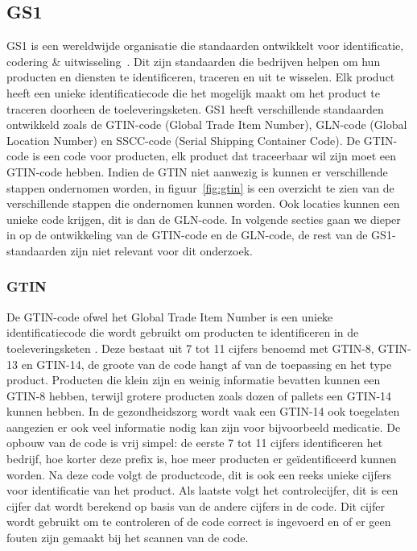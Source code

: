 \subsection{GS1}
GS1 is een wereldwijde organisatie die standaarden ontwikkelt voor identificatie, codering \& uitwisseling~\autocite{GS1standards}.
Dit zijn standaarden die bedrijven helpen om hun producten en diensten te identificeren, traceren en uit te wisselen.
Elk product heeft een unieke identificatiecode die het mogelijk maakt om het product te traceren doorheen de toeleveringsketen.
GS1 heeft verschillende standaarden ontwikkeld zoals de GTIN-code (Global Trade Item Number), GLN-code (Global Location Number) en SSCC-code (Serial Shipping Container Code).
De GTIN-code is een code voor producten, elk product dat traceerbaar wil zijn moet een GTIN-code hebben. 
Indien de GTIN niet aanwezig is kunnen er verschillende stappen ondernomen worden, in figuur~\ref{fig:gtin} is een overzicht te zien van de verschillende stappen die ondernomen kunnen worden.
Ook locaties kunnen een unieke code krijgen, dit is dan de GLN-code. In volgende secties gaan we dieper in op de ontwikkeling van de GTIN-code en de GLN-code, de rest van de GS1-standaarden zijn niet relevant voor dit onderzoek.

\subsubsection{GTIN}
De GTIN-code ofwel het Global Trade Item Number is een unieke identificatiecode die wordt gebruikt om producten te identificeren in de toeleveringsketen \autocite{GTIN2025}.
Deze bestaat uit 7 tot 11 cijfers benoemd met GTIN-8, GTIN-13 en GTIN-14, de groote van de code hangt af van de toepassing en het type product.
Producten die klein zijn en weinig informatie bevatten kunnen een GTIN-8 hebben, terwijl grotere producten zoals dozen of pallets een GTIN-14 kunnen hebben.
In de gezondheidszorg wordt vaak een GTIN-14 ook toegelaten aangezien er ook veel informatie nodig kan zijn voor bijvoorbeeld medicatie.
De opbouw van de code is vrij simpel: de eerste 7 tot 11 cijfers identificeren het bedrijf, hoe korter deze prefix is, hoe meer producten er geïdentificeerd kunnen worden.
Na deze code volgt de productcode, dit is ook een reeks unieke cijfers voor identificatie van het product.
Als laatste volgt het controlecijfer, dit is een cijfer dat wordt berekend op basis van de andere cijfers in de code.
Dit cijfer wordt gebruikt om te controleren of de code correct is ingevoerd en of er geen fouten zijn gemaakt bij het scannen van de code.


